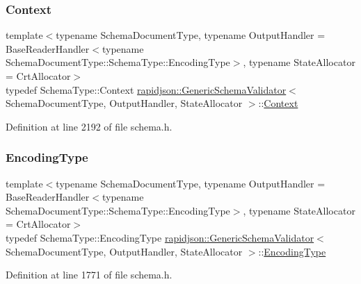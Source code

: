 \subsubsection{\texorpdfstring{Context}{Context}}
{\footnotesize\ttfamily template$<$typename Schema\+Document\+Type, typename Output\+Handler = Base\+Reader\+Handler$<$typename Schema\+Document\+Type\+::\+Schema\+Type\+::\+Encoding\+Type$>$, typename State\+Allocator = Crt\+Allocator$>$ \\
typedef Schema\+Type\+::\+Context \mbox{\hyperlink{classrapidjson_1_1_generic_schema_validator}{rapidjson\+::\+Generic\+Schema\+Validator}}$<$ Schema\+Document\+Type, Output\+Handler, State\+Allocator $>$\+::\mbox{\hyperlink{classrapidjson_1_1_generic_schema_validator_ae76e4602ce2ef7070a57f0df5bb07e76}{Context}}\hspace{0.3cm}{\ttfamily [private]}}



Definition at line 2192 of file schema.\+h.

\mbox{\label{classrapidjson_1_1_generic_schema_validator_abaea0f74722261f6dde0db65594efdfe}} 
\subsubsection{\texorpdfstring{EncodingType}{EncodingType}}
{\footnotesize\ttfamily template$<$typename Schema\+Document\+Type, typename Output\+Handler = Base\+Reader\+Handler$<$typename Schema\+Document\+Type\+::\+Schema\+Type\+::\+Encoding\+Type$>$, typename State\+Allocator = Crt\+Allocator$>$ \\
typedef Schema\+Type\+::\+Encoding\+Type \mbox{\hyperlink{classrapidjson_1_1_generic_schema_validator}{rapidjson\+::\+Generic\+Schema\+Validator}}$<$ Schema\+Document\+Type, Output\+Handler, State\+Allocator $>$\+::\mbox{\hyperlink{classrapidjson_1_1_generic_schema_validator_abaea0f74722261f6dde0db65594efdfe}{Encoding\+Type}}}



Definition at line 1771 of file schema.\+h.

